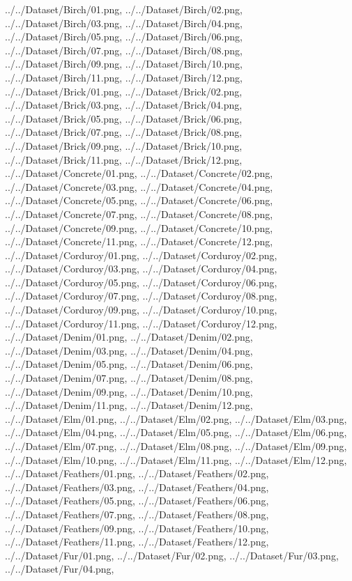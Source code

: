 {../../Dataset/Birch/01.png,
../../Dataset/Birch/02.png,
../../Dataset/Birch/03.png,
../../Dataset/Birch/04.png,
../../Dataset/Birch/05.png,
../../Dataset/Birch/06.png,
../../Dataset/Birch/07.png,
../../Dataset/Birch/08.png,
../../Dataset/Birch/09.png,
../../Dataset/Birch/10.png,
../../Dataset/Birch/11.png,
../../Dataset/Birch/12.png,
../../Dataset/Brick/01.png,
../../Dataset/Brick/02.png,
../../Dataset/Brick/03.png,
../../Dataset/Brick/04.png,
../../Dataset/Brick/05.png,
../../Dataset/Brick/06.png,
../../Dataset/Brick/07.png,
../../Dataset/Brick/08.png,
../../Dataset/Brick/09.png,
../../Dataset/Brick/10.png,
../../Dataset/Brick/11.png,
../../Dataset/Brick/12.png,
../../Dataset/Concrete/01.png,
../../Dataset/Concrete/02.png,
../../Dataset/Concrete/03.png,
../../Dataset/Concrete/04.png,
../../Dataset/Concrete/05.png,
../../Dataset/Concrete/06.png,
../../Dataset/Concrete/07.png,
../../Dataset/Concrete/08.png,
../../Dataset/Concrete/09.png,
../../Dataset/Concrete/10.png,
../../Dataset/Concrete/11.png,
../../Dataset/Concrete/12.png,
../../Dataset/Corduroy/01.png,
../../Dataset/Corduroy/02.png,
../../Dataset/Corduroy/03.png,
../../Dataset/Corduroy/04.png,
../../Dataset/Corduroy/05.png,
../../Dataset/Corduroy/06.png,
../../Dataset/Corduroy/07.png,
../../Dataset/Corduroy/08.png,
../../Dataset/Corduroy/09.png,
../../Dataset/Corduroy/10.png,
../../Dataset/Corduroy/11.png,
../../Dataset/Corduroy/12.png,
../../Dataset/Denim/01.png,
../../Dataset/Denim/02.png,
../../Dataset/Denim/03.png,
../../Dataset/Denim/04.png,
../../Dataset/Denim/05.png,
../../Dataset/Denim/06.png,
../../Dataset/Denim/07.png,
../../Dataset/Denim/08.png,
../../Dataset/Denim/09.png,
../../Dataset/Denim/10.png,
../../Dataset/Denim/11.png,
../../Dataset/Denim/12.png,
../../Dataset/Elm/01.png,
../../Dataset/Elm/02.png,
../../Dataset/Elm/03.png,
../../Dataset/Elm/04.png,
../../Dataset/Elm/05.png,
../../Dataset/Elm/06.png,
../../Dataset/Elm/07.png,
../../Dataset/Elm/08.png,
../../Dataset/Elm/09.png,
../../Dataset/Elm/10.png,
../../Dataset/Elm/11.png,
../../Dataset/Elm/12.png,
../../Dataset/Feathers/01.png,
../../Dataset/Feathers/02.png,
../../Dataset/Feathers/03.png,
../../Dataset/Feathers/04.png,
../../Dataset/Feathers/05.png,
../../Dataset/Feathers/06.png,
../../Dataset/Feathers/07.png,
../../Dataset/Feathers/08.png,
../../Dataset/Feathers/09.png,
../../Dataset/Feathers/10.png,
../../Dataset/Feathers/11.png,
../../Dataset/Feathers/12.png,
../../Dataset/Fur/01.png,
../../Dataset/Fur/02.png,
../../Dataset/Fur/03.png,
../../Dataset/Fur/04.png,
}
